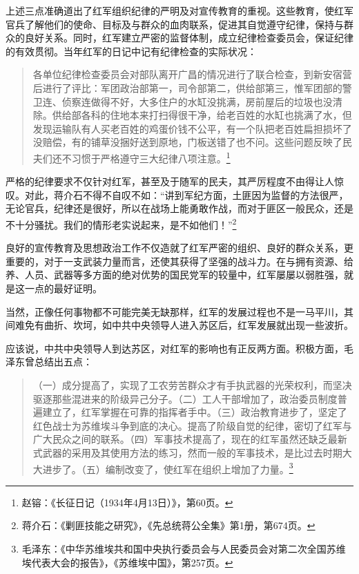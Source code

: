 上述三点准确道出了红军组织纪律的严明及对宣传教育的重视。这些教育，使红军官兵了解他们的使命、目标及与群众的血肉联系，促进其自觉遵守纪律，保持与群众的良好关系。同时，红军建立严密的监督体制，成立纪律检查委员会，保证纪律的有效贯彻。当年红军的日记中记有纪律检查的实际状况：

\begin{quote}

各单位纪律检查委员会对部队离开广昌的情况进行了联合检查，到新安宿营后进行了评比：军团政治部第一，司令部第二，供给部第三，惟军团部的警卫连、侦察连做得不好，大多住户的水缸没挑满，房前屋后的垃圾也没清除。供给部各科的住地本来打扫得很干净，给老百姓的水缸也挑满了水，但发现运输队有人买老百姓的鸡蛋价钱不公平，有一个队把老百姓扁担损坏了没赔偿，有的铺草没捆好送到原地，门板送错了也不问。这些问题反映了民夫们还不习惯于严格遵守三大纪律八项注意。\footnote{赵镕：《长征日记（1934年4月13日）》，第60页。}
\end{quote}


严格的纪律要求不仅针对红军，甚至及于随军的民夫，其严厉程度不由得让人惊叹。对此，蒋介石不得不自叹不如：“讲到军纪方面，土匪因为监督的方法很严，无论官兵，纪律还是很好，所以在战场上能勇敢作战，而对于匪区一般民众，还是不十分骚扰。我们的情形老实说起来，是不如他们！”\footnote{蒋介石：《剿匪技能之研究》，《先总统蒋公全集》第1册，第674页。}


良好的宣传教育及思想政治工作不仅造就了红军严密的组织、良好的群众关系，更重要的，对于一支武装力量而言，还使其获得了坚强的战斗力。在与拥有资源、给养、人员、武器等多方面的绝对优势的国民党军的较量中，红军屡屡以弱胜强，就是这一点的最好证明。


当然，正像任何事物都不可能完美无缺那样，红军的发展过程也不是一马平川，其间难免有曲折、坎坷，如中共中央领导人进入苏区后，红军发展就出现一些波折。


应该说，中共中央领导人到达苏区，对红军的影响也有正反两方面。积极方面，毛泽东曾总结出五点：

\begin{quote}

（一）成分提高了，实现了工农劳苦群众才有手执武器的光荣权利，而坚决驱逐那些混进来的阶级异己分子。（二）工人干部增加了，政治委员制度普遍建立了，红军掌握在可靠的指挥者手中。（三）政治教育进步了，坚定了红色战士为苏维埃斗争到底的决心。提高了阶级自觉的纪律，密切了红军与广大民众之间的联系。（四）军事技术提高了，现在的红军虽然还缺乏最新式武器的采用及其使用方法的练习，然而一般的军事技术，是比过去时期大大进步了。（五）编制改变了，使红军在组织上增加了力量。\footnote{毛泽东：《中华苏维埃共和国中央执行委员会与人民委员会对第二次全国苏维埃代表大会的报告》，《苏维埃中国》，第257页。}
\end{quote}


